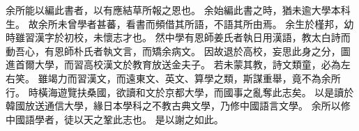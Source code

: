 余所能以編此書者，以有應結草所報之恩也。
余始編此書之時，猶未逾大學本科生。
故余所未曾學者甚蕃，看書而頻借其所語，不語其所由焉。
余生於槿邦，幼時雖習漢字於初校，未懷志才也。
然中學有恩師姜氏者執日用漢語，教太白詩而動吾心，有恩師朴氏者執文言，而矯余病文。
因故退於高校，妄思此身之分，圖進首爾大學，而習高校漢文於教育放送金夫子。
若未蒙其教，詩文類童，必為左右笑。
雖竭力而習漢文，而遠東文、英文、算學之類，斯謀重舉，竟不為余所行。
時橫海遊覽扶桑國，欲讀和文於京都大學，而國事之亂奪此志矣。
以是讀於韓國放送通信大學，緣日本學科之不教古典文學，乃修中國語言文學。
余所以修中國語學者，徒以天之鞏此志也。
是以謝之如此。